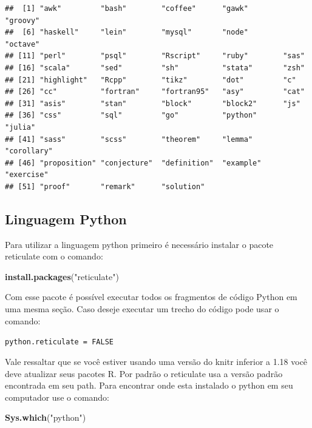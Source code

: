 \documentclass[
]{book}
\newenvironment{Shaded}{\begin{snugshade}}{\end{snugshade}}
\newcommand{\KeywordTok}[1]{\textcolor[rgb]{0.13,0.29,0.53}{\textbf{#1}}}
\newcommand{\NormalTok}[1]{#1}
\newcommand{\StringTok}[1]{\textcolor[rgb]{0.31,0.60,0.02}{#1}}
\begin{document}
\begin{verbatim}
##  [1] "awk"         "bash"        "coffee"      "gawk"        "groovy"     
##  [6] "haskell"     "lein"        "mysql"       "node"        "octave"     
## [11] "perl"        "psql"        "Rscript"     "ruby"        "sas"        
## [16] "scala"       "sed"         "sh"          "stata"       "zsh"        
## [21] "highlight"   "Rcpp"        "tikz"        "dot"         "c"          
## [26] "cc"          "fortran"     "fortran95"   "asy"         "cat"        
## [31] "asis"        "stan"        "block"       "block2"      "js"         
## [36] "css"         "sql"         "go"          "python"      "julia"      
## [41] "sass"        "scss"        "theorem"     "lemma"       "corollary"  
## [46] "proposition" "conjecture"  "definition"  "example"     "exercise"   
## [51] "proof"       "remark"      "solution"
\end{verbatim}

\hypertarget{linguagem-python}{%
\subsection{Linguagem Python}\label{linguagem-python}}

Para utilizar a linguagem python primeiro é necessário instalar o pacote reticulate com o comando:

\begin{Shaded}
\begin{Highlighting}[]
\KeywordTok{install.packages}\NormalTok{(}\StringTok{"reticulate"}\NormalTok{)}
\end{Highlighting}
\end{Shaded}

Com esse pacote é possível executar todos os fragmentos de código Python em uma mesma seção. Caso deseje executar um trecho do código pode usar o comando:

\texttt{python.reticulate\ =\ FALSE}

Vale ressaltar que se você estiver usando uma versão do knitr inferior a 1.18 você deve atualizar seus pacotes R. Por padrão o reticulate usa a versão padrão encontrada em seu path. Para encontrar onde esta instalado o python em seu computador use o comando:

\begin{Shaded}
\begin{Highlighting}[]
\KeywordTok{Sys.which}\NormalTok{(}\StringTok{"python"}\NormalTok{)}
\end{Highlighting}
\end{Shaded}
\end{document}
